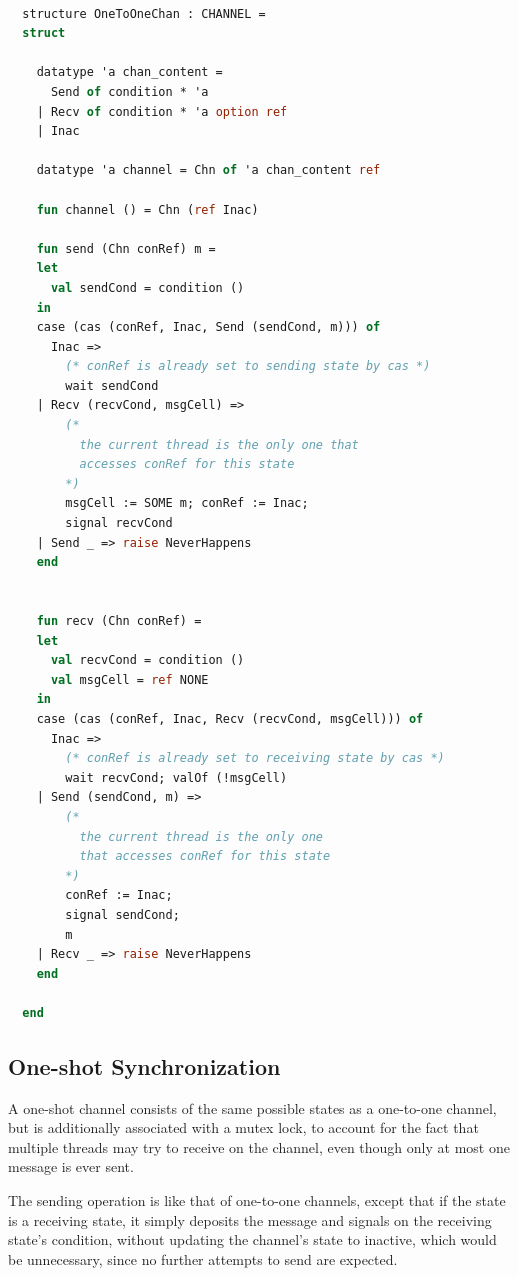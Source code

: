 \documentclass[10pt]{article}
\begin{document}
\begin{lstlisting}[language=ML, mathescape]

  structure OneToOneChan : CHANNEL =
  struct

    datatype 'a chan_content =
      Send of condition * 'a
    | Recv of condition * 'a option ref
    | Inac  

    datatype 'a channel = Chn of 'a chan_content ref

    fun channel () = Chn (ref Inac)

    fun send (Chn conRef) m =
    let
      val sendCond = condition ()
    in
    case (cas (conRef, Inac, Send (sendCond, m))) of
      Inac => 
        (* conRef is already set to sending state by cas *)
        wait sendCond
    | Recv (recvCond, msgCell) =>
        (*
          the current thread is the only one that
          accesses conRef for this state
        *)
        msgCell := SOME m; conRef := Inac;
        signal recvCond
    | Send _ => raise NeverHappens
    end


    fun recv (Chn conRef) =
    let
      val recvCond = condition ()
      val msgCell = ref NONE 
    in
    case (cas (conRef, Inac, Recv (recvCond, msgCell))) of
      Inac =>
        (* conRef is already set to receiving state by cas *)
        wait recvCond; valOf (!msgCell)
    | Send (sendCond, m) =>
        (*
          the current thread is the only one
          that accesses conRef for this state
        *)
        conRef := Inac;
        signal sendCond;
        m
    | Recv _ => raise NeverHappens
    end 

  end
\end{lstlisting}

\subsection{One-shot Synchronization}

A one-shot channel consists of the same possible states as a one-to-one channel, but is
additionally associated with a mutex lock, to account for the fact that multiple threads may
try to receive on the channel, even though only at most one message is ever sent.

The sending operation is like that of one-to-one channels,
except that if the state is a receiving state, it simply deposits the message and signals
on the receiving state's condition,
without updating the channel's state to inactive, which would be unnecessary, since
no further attempts to send are expected.
\end{document}
